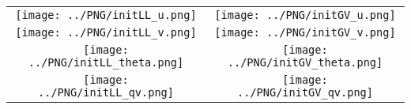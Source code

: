 \documentclass{article}
\begin{document}
\newpage

\begin{table}
  \begin{tabular}{cc}
     \texttt{[image: ../PNG/initLL\_u.png]}     & \texttt{[image: ../PNG/initGV\_u.png]}     \\
     \texttt{[image: ../PNG/initLL\_v.png]}     & \texttt{[image: ../PNG/initGV\_v.png]}     \\
     \texttt{[image: ../PNG/initLL\_theta.png]} & \texttt{[image: ../PNG/initGV\_theta.png]} \\
     \texttt{[image: ../PNG/initLL\_qv.png]}    & \texttt{[image: ../PNG/initGV\_qv.png]}
  \end{tabular}
\end{table}
\end{document}
